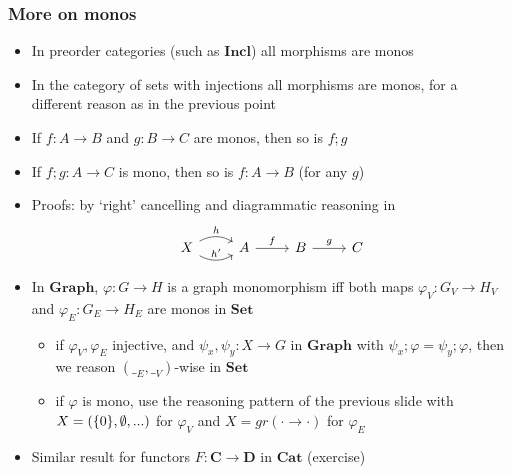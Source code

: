 \documentclass[handout]{beamer}
\newcommand{\bfsf}[1]{{\boldsymbol{#1}}}
\newcommand{\Set}{\bfsf{Set}}
\newcommand{\Gra}{\bfsf{Graph}}
\newcommand{\CC}{\bfsf{C}}
\newcommand{\DD}{\bfsf{D}}
\newcommand{\Incl}{\bfsf{Incl}}
\newcommand{\Cat}{\bfsf{Cat}}
\begin{document}
\frame
  {   
    \frametitle{More on monos}\label{Ch4:Moronmonos}

 \begin{itemize}[<+->]
\item In preorder categories (such as $\Incl$) all morphisms are monos
\item In the category of sets with injections all morphisms are monos,
for a different reason as in the previous point
\item If $f:A\to B$ and $g:B\to C$ are monos, then so is $f;g$
\item If $f;g: A\to C$ is mono, then so is $f:A\to B$ (for any $g$)
\item Proofs: by `right' cancelling  and diagrammatic reasoning in
\[
\begin{tikzcd}[ampersand replacement=\&]
X \arrow[bend left]{r}{h}\arrow[bend right]{r}{h'} \& 
A \arrow{r}{f}\& B \arrow{r}{g} \& C
\end{tikzcd}
\]
\item In $\Gra$, $\varphi: G\to H$ is a graph monomorphism iff both
maps $\varphi_V: G_V\to H_V$ and $\varphi_E: G_E\to H_E$ are monos in $\Set$
 \begin{itemize}
    \item if $\varphi_V,\varphi_E$ injective, and $\psi_x,\psi_y: X\to G$ in $\Gra$
with $\psi_x;\varphi = \psi_y;\varphi$, then we reason $(\__E,\__V)$-wise in $\Set$
    \item if $\varphi$ is mono, use the reasoning pattern  of the previous
slide with $X=(\{0\},\emptyset,...)$ for 
$\varphi_V$ and $X=gr({\cdot}{\to}{\cdot})$ for $\varphi_E$
\end{itemize}
\item Similar result for functors $F: \CC\to\DD$ in $\Cat$ (exercise)
 \end{itemize}

 }
\end{document}

